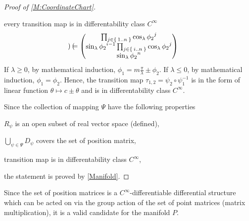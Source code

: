 \documentclass[../methodology.tex]{subfiles}
\begin{document}
\begin{proof}[Proof of \cref{M:CoordinateChart}]
\begin{subproof}{every transition map is in differentability class \(C^\infty\)}
\begin{align*}
\begin{pmatrix}
            \end{pmatrix}
             & =
            \begin{pmatrix}
                \prod_{j\in\Set{1..n}}{\cos_\lambda{\tensor{{\phi_2}}{^j}}}                                        \\
                \sin_\lambda{\tensor{{\phi_2}}{^{i-1}}}\prod_{j\in\Set{i..n}}{\cos_\lambda{\tensor{{\phi_2}}{^j}}} \\
                \sin_\lambda{{\tensor{{\phi_2}}{^n}}}                                                              \\
            \end{pmatrix}
        \end{align*}
        If \(\lambda\ge 0\), by mathematical induction, \(\phi_1=m\frac{\pi}{\lambda}\pm\phi_2\).
        If \(\lambda\le 0\), by mathematical induction, \(\phi_1 =\phi_2\).
        Hence, the transition map \(\tau_{1,2} =\psi_2\circ\psi_1^{-1}\)
        is in the form of linear function \(\theta\mapsto c\pm\theta\)
        and is in differentability class \(C^\infty\).
    \end{subproof}
    Since the collection of mapping \(\Psi\) have the following properties
    \begin{APAenumerate}
        \item \(R_\psi\) is an open subset of real vector space (defined),
        \item \(\bigcup_{\psi\in\Psi} D_\psi\) covers the set of position matrix,
        \item transition map is in differentability class \(C^\infty\),
    \end{APAenumerate}
    the statement is proved by \cref{Manifold}.
\end{proof}
\begin{remark}\label{M:Manifold}
    Since the set of position matrices is a \(C^\infty\)-differentiable differential structure
    which can be acted on via the group action of the set of point matrices (matrix multiplication),
    it is a valid candidate for the manifold \(P\).
\end{remark}
\end{document}
